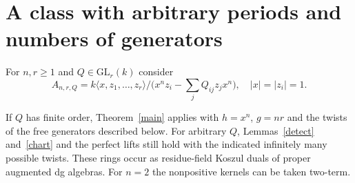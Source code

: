 \documentclass[11pt]{article}
\begin{document}
\section{A class with arbitrary periods and numbers of generators}
For $n,r\ge1$ and $Q\in\mathrm{GL}_r(k)$ consider
\[
 A_{n,r,Q}=k\langle x,z_1,\ldots,z_r\rangle/
 \big(x^n z_i-\textstyle\sum_j Q_{ij}z_j x^n\big),\quad
 |x|=|z_i|=1 .
\]
\begin{cor}\label{family}
If $Q$ has finite order, Theorem~\ref{main} applies with $h=x^n$,
$g=nr$ and the twists of the free generators described below. For
arbitrary $Q$, Lemmas~\ref{detect} and~\ref{chart} and the perfect lifts
still hold with the indicated infinitely many possible twists.
These rings occur as residue-field Koszul duals of proper augmented
dg algebras. For $n=2$ the nonpositive kernels can be taken two-term.
\end{cor}
\end{document}
